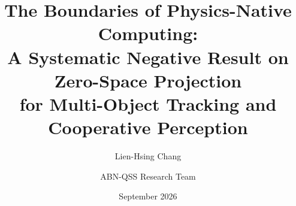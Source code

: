 \documentclass[11pt,letterpaper]{article}
\title{
    \bfseries The Boundaries of Physics-Native Computing:\\
    A Systematic Negative Result on Zero-Space Projection\\
    for Multi-Object Tracking and Cooperative Perception
}
\author[1]{Lien-Hsing Chang}
\author[2]{ABN-QSS Research Team}
\affil[1]{Independent Researcher}
\affil[2]{\texttt{abn-qss@research.org}}
\date{September 2026}
\theoremstyle{definition}
\begin{document}
\maketitle

\begin{abstract}

\end{abstract}

\tableofcontents
\newpage












\newpage
\appendix



\end{document}
